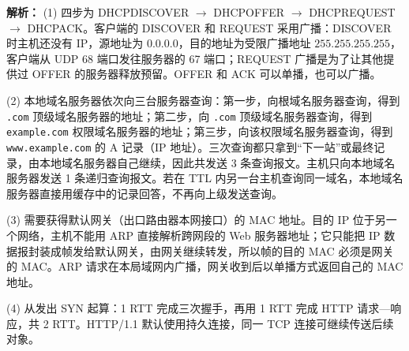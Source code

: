 \begin{enumerate}
\ifshowsolutions\par\noindent\textbf{解析：}
(1) 四步为 DHCPDISCOVER $\to$ DHCPOFFER $\to$ DHCPREQUEST $\to$ DHCPACK。客户端的 DISCOVER 和 REQUEST 采用广播：DISCOVER 时主机还没有 IP，源地址为 $0.0.0.0$，目的地址为受限广播地址 $255.255.255.255$，客户端从 UDP 68 端口发往服务器的 67 端口；REQUEST 广播是为了让其他提供过 OFFER 的服务器释放预留。OFFER 和 ACK 可以单播，也可以广播。

(2) 本地域名服务器依次向三台服务器查询：第一步，向根域名服务器查询，得到 \texttt{.com} 顶级域名服务器的地址；第二步，向 \texttt{.com} 顶级域名服务器查询，得到 \texttt{example.com} 权限域名服务器的地址；第三步，向该权限域名服务器查询，得到 \texttt{www.example.com} 的 A 记录（IP 地址）。三次查询都只拿到“下一站”或最终记录，由本地域名服务器自己继续，因此共发送 3 条查询报文。主机只向本地域名服务器发送 1 条递归查询报文。若在 TTL 内另一台主机查询同一域名，本地域名服务器直接用缓存中的记录回答，不再向上级发送查询。

(3) 需要获得默认网关（出口路由器本网接口）的 MAC 地址。目的 IP 位于另一个网络，主机不能用 ARP 直接解析跨网段的 Web 服务器地址；它只能把 IP 数据报封装成帧发给默认网关，由网关继续转发，所以帧的目的 MAC 必须是网关的 MAC。ARP 请求在本局域网内广播，网关收到后以单播方式返回自己的 MAC 地址。

(4) 从发出 SYN 起算：1 RTT 完成三次握手，再用 1 RTT 完成 HTTP 请求—响应，共 2 RTT。HTTP/1.1 默认使用持久连接，同一 TCP 连接可继续传送后续对象。
\else \answerarea[10] \fi

\end{enumerate}
